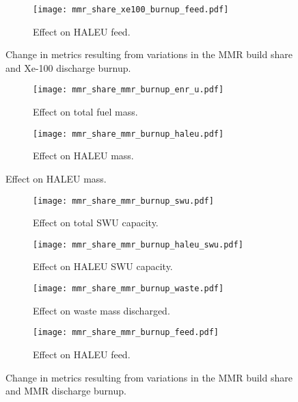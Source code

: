 \begin{figure}
    \ContinuedFloat
    \begin{subfigure}[t]{0.48\textwidth}
        \centering
        \texttt{[image: mmr\_share\_xe100\_burnup\_feed.pdf]}
        \caption{Effect on HALEU feed.}
        \label{fig:mmr_share_xe100_burnup_feed}
    \end{subfigure}
    \caption{Change in metrics resulting from variations in the 
    MMR build share and Xe-100 discharge burnup.}
    \label{fig:mmr_share_xe100_burnup}
\end{figure}

\begin{figure}
    \begin{subfigure}[t]{0.48\textwidth}
        \centering
        \texttt{[image: mmr\_share\_mmr\_burnup\_enr\_u.pdf]}
        \caption{Effect on total fuel mass.}
        \label{fig:mmr_share_mmr_burnup_enr_u}
    \end{subfigure}
    \hfill
    \begin{subfigure}[t]{0.48\textwidth}
        \centering
        \texttt{[image: mmr\_share\_mmr\_burnup\_haleu.pdf]}
        \caption{Effect on HALEU mass.}
        \label{fig:mmr_share_mmr_burnup_haleu}
    \end{subfigure}
\end{figure}

\begin{figure}
    \ContinuedFloat    
    \begin{subfigure}[t]{0.48\textwidth}
        \centering
        \texttt{[image: mmr\_share\_mmr\_burnup\_swu.pdf]}
        \caption{Effect on total SWU capacity.}
        \label{fig:mmr_share_mmr_burnup_swu}
    \end{subfigure}
    \hfill
    \begin{subfigure}[t]{0.48\textwidth}
        \centering
        \texttt{[image: mmr\_share\_mmr\_burnup\_haleu\_swu.pdf]}
        \caption{Effect on HALEU SWU capacity.}
        \label{fig:mmr_share_mmr_burnup_haleu_swu}
    \end{subfigure}
    
    \begin{subfigure}[t]{0.48\textwidth}
        \centering
        \texttt{[image: mmr\_share\_mmr\_burnup\_waste.pdf]}
        \caption{Effect on waste mass discharged.}
        \label{fig:mmr_share_mmr_burnup_waste}
    \end{subfigure}
    \hfill
    \begin{subfigure}[t]{0.48\textwidth}
        \centering
        \texttt{[image: mmr\_share\_mmr\_burnup\_feed.pdf]}
        \caption{Effect on HALEU feed.}
        \label{fig:mmr_share_mmr_burnup_feed}
    \end{subfigure}
    \caption{Change in metrics resulting from variations in the 
    MMR build share and MMR discharge burnup.}
    \label{fig:mmr_share_mmr_burnup}
\end{figure}

